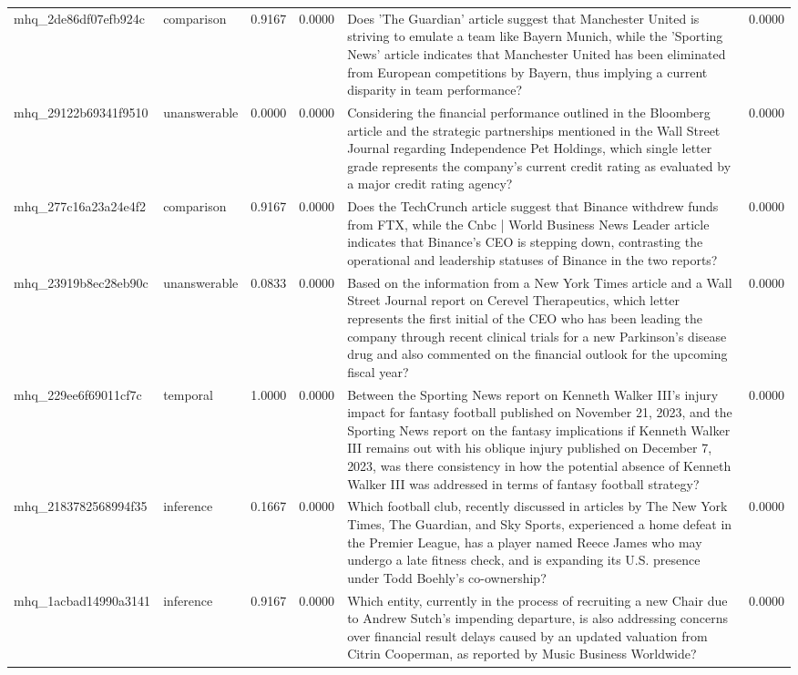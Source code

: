 \begin{tabular}{llrrlr}
mhq_2de86df07efb924c & comparison & 0.9167 & 0.0000 & Does 'The Guardian' article suggest that Manchester United is striving to emulate a team like Bayern Munich, while the 'Sporting News' article indicates that Manchester United has been eliminated from European competitions by Bayern, thus implying a current disparity in team performance? & 0.0000 \\
mhq_29122b69341f9510 & unanswerable & 0.0000 & 0.0000 & Considering the financial performance outlined in the Bloomberg article and the strategic partnerships mentioned in the Wall Street Journal regarding Independence Pet Holdings, which single letter grade represents the company's current credit rating as evaluated by a major credit rating agency? & 0.0000 \\
mhq_277c16a23a24e4f2 & comparison & 0.9167 & 0.0000 & Does the TechCrunch article suggest that Binance withdrew funds from FTX, while the Cnbc | World Business News Leader article indicates that Binance's CEO is stepping down, contrasting the operational and leadership statuses of Binance in the two reports? & 0.0000 \\
mhq_23919b8ec28eb90c & unanswerable & 0.0833 & 0.0000 & Based on the information from a New York Times article and a Wall Street Journal report on Cerevel Therapeutics, which letter represents the first initial of the CEO who has been leading the company through recent clinical trials for a new Parkinson's disease drug and also commented on the financial outlook for the upcoming fiscal year? & 0.0000 \\
mhq_229ee6f69011cf7c & temporal & 1.0000 & 0.0000 & Between the Sporting News report on Kenneth Walker III's injury impact for fantasy football published on November 21, 2023, and the Sporting News report on the fantasy implications if Kenneth Walker III remains out with his oblique injury published on December 7, 2023, was there consistency in how the potential absence of Kenneth Walker III was addressed in terms of fantasy football strategy? & 0.0000 \\
mhq_2183782568994f35 & inference & 0.1667 & 0.0000 & Which football club, recently discussed in articles by The New York Times, The Guardian, and Sky Sports, experienced a home defeat in the Premier League, has a player named Reece James who may undergo a late fitness check, and is expanding its U.S. presence under Todd Boehly's co-ownership? & 0.0000 \\
mhq_1acbad14990a3141 & inference & 0.9167 & 0.0000 & Which entity, currently in the process of recruiting a new Chair due to Andrew Sutch's impending departure, is also addressing concerns over financial result delays caused by an updated valuation from Citrin Cooperman, as reported by Music Business Worldwide? & 0.0000 \\

\end{tabular}
